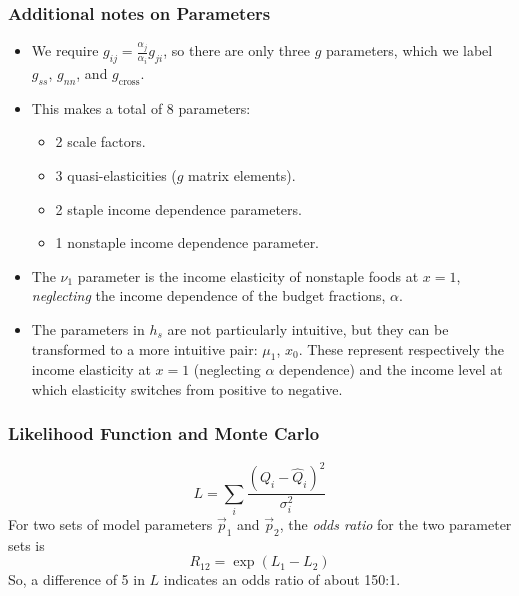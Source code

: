 \documentclass{beamer}
\begin{document}
\begin{frame}
  \frametitle{Additional notes on Parameters}
  \begin{itemize}
    \item We require $g_{ij} = \frac{\alpha_j}{\alpha_i}g_{ji}$, so there are only three $g$
      parameters, which we label $g_{ss}$, $g_{nn}$, and
      $g_{\text{cross}}$.
    \item This makes a total of 8 parameters:
      \begin{itemize}
      \item 2 scale factors.
      \item 3 quasi-elasticities ($g$ matrix elements).
      \item 2 staple income dependence parameters.
      \item 1 nonstaple income dependence parameter.
      \end{itemize}
    \item The $\nu_1$ parameter is the income elasticity of nonstaple
      foods at $x=1$, \emph{neglecting} the income dependence of the
      budget fractions, $\alpha$.
    \item The parameters in $h_s$ are not particularly intuitive, but
      they can be transformed to a more intuitive pair: $\mu_1$,
      $x_0$.  These represent respectively the income elasticity at
      $x=1$ (neglecting $\alpha$ dependence) and the income level at
      which elasticity switches from positive to negative.
  \end{itemize}
\end{frame}

\begin{frame}
  \frametitle{Likelihood Function and Monte Carlo}
  \begin{equation}
    L = \sum_i \frac{(Q_i - \hat{Q}_i)^2}{\sigma_i^2}
  \end{equation}
  For two sets of model parameters $\vec{p}_1$ and $\vec{p}_2$, the
  \emph{odds ratio} for the two parameter sets is
  \begin{equation}
    R_{12} = \exp\left(L_1 - L_2\right)
  \end{equation}
  So, a difference of 5 in $L$ indicates an odds ratio of about 150:1.
\end{frame}
\end{document}
